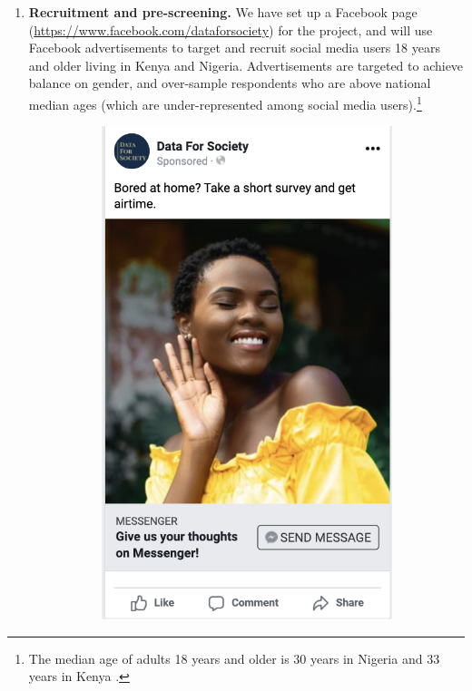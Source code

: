 \documentclass[letterpaper, 12pt, parskip=full,DIV=10]{scrartcl}
\begin{document}
\begin{enumerate}
\item \textbf{Recruitment and pre-screening.} We have set up a Facebook page (\url{https://www.facebook.com/dataforsociety}) for the project, and will use Facebook advertisements to target and recruit social media users 18 years and older living in Kenya and Nigeria. Advertisements are targeted to achieve balance on gender, and over-sample respondents who are above national median ages (which are under-represented among social media users).\footnote{The median age of adults 18 years and older is 30 years in Nigeria \citep{afrobarometer-ng-2018} and 33 years in Kenya \citep{afrobarometer-ky-2020}.}

\begin{figure}[h!]
   \centering
   \begin{subfigure}{0.45\textwidth}
  \centering
  \includegraphics[width = \textwidth]{../../tables-figures/ad1.png} 

\end{subfigure}
\end{figure}
\end{enumerate}
\end{document}
